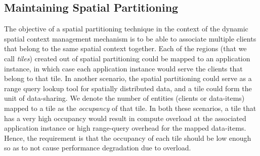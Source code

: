 \subsection{Maintaining Spatial Partitioning}
The objective of a spatial partitioning technique in the context of the dynamic spatial context management mechanism is to be able to associate multiple clients that belong to the same spatial context together. Each of the regions (that we call \textit{tiles}) created out of spatial partitioning could be mapped to an application instance, in which case each application instance would serve the clients that belong to that tile. In another scenario, the spatial partitioning could serve as a range query lookup tool for spatially distributed data, and a tile could form the unit of data-sharing. We denote the number of entities (clients or data-items) mapped to a tile as the \textit{occupancy} of that tile. In both these scenarios, a tile that has a very high occupancy would result in compute overload at the associated application instance or high range-query overhead for the mapped data-items. Hence, the requirement is that the occupancy of each tile should be low enough so as to not cause performance degradation due to overload. 
